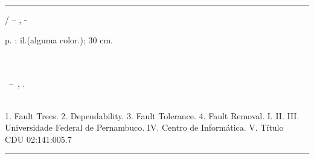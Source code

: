 \begin{fichacatalografica}
  \sffamily
  \vspace*{15cm} %
  \hrule %
  \begin{center} %
  \begin{minipage}[c]{12.5cm} %

    \imprimirautor

    \hspace{0.5cm} \imprimirtitulo / \imprimirautor -- 
    \imprimirlocal, \imprimirdata-

    \hspace{0.5cm} \pageref{LastPage} p. : il.(alguma color.); 30 cm.\\
    
    \hspace{0.5cm} \imprimirorientadorRotulo{} \imprimirorientador{}\\

    \hspace{0.5cm} \imprimircoorientadorRotulo{} \imprimircoorientador{}\\

    \hspace{0.5cm}
    \parbox[t]{\textwidth}{%
      \imprimirtipotrabalho~--~\imprimirinstituicao,
      \imprimirdata.
    }\\

    \hspace{0.5cm}
    1. Fault Trees.
    2. Dependability.
    3. Fault Tolerance.
    4. Fault Removal.
    I. \imprimirorientador{} 
    II. \imprimircoorientador{}
    III. Universidade Federal de Pernambuco.
    IV. Centro de Informática.
    V. Título\\

    \hspace{8.75cm} CDU 02:141:005.7\\

  \end{minipage}
  \end{center}
  \hrule
\end{fichacatalografica}